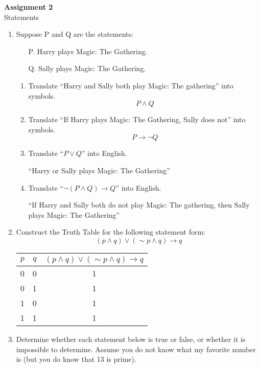 \documentclass[11pt, letterpaper, includehead]{article}
\begin{document}
 

\pagestyle{fancy}
\fancyhead{}
\fancyfoot{}


\begin{center}
    \Large{\textbf{Assignment 2}}\\
    \Large{Statements}
\end{center}

\begin{enumerate}[label=\textbf{\arabic*}.]
    \item Suppose P and Q are the statements:
\begin{enumerate}
    \item[P.] Harry plays Magic: The Gathering.
    \item[Q.] Sally plays Magic: The Gathering.
\end{enumerate}

\begin{enumerate}[label= (\alph*)]
    \item Translate ``Harry and Sally both play Magic: The gathering'' into symbols.
    \[P \wedge Q\]
    \item Translate ``If Harry plays Magic: The Gathering, Sally does not'' into symbols.
    \[P \rightarrow \neg Q \]
    \item Translate ``$P \vee Q$'' into English.

    ``Harry or Sally plays Magic: The Gathering''
    \item Translate ``$\neg (P \wedge Q) \rightarrow Q$'' into English.
    
    ``If Harry and Sally both do not play Magic: The gathering, then Sally plays Magic: The Gathering''
\end{enumerate}
\item  Construct the Truth Table for the following statement form:
\[(p \wedge q) \vee (\sim p \wedge q) \rightarrow q\]

\begin{table}[H]
    \centering
    \begin{tabular}{cc|c}
    $p$ & $q$ & $(p \wedge q) \vee (\sim p \wedge q) \rightarrow q$ \\ \hline
    0 & 0 &  1\\
    0 & 1 &  1\\
    1 & 0 &  1\\
    1 & 1 &  1\\
    \end{tabular}
\end{table}
\item Determine whether each statement below is true or false, or whether it is impossible to determine. Assume you do not know what my favorite number is (but you do know that 13 is prime).


\end{enumerate}
\end{document}
